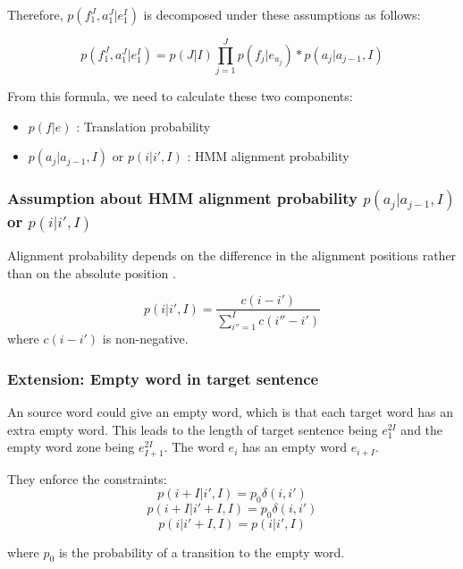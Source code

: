 \documentclass{article}
\begin{document}
Therefore, $p(f_1^J, a_1^J|e_1^I)$ is decomposed under these assumptions as follows:

\begin{equation}
p(f_1^J, a_1^J|e_1^I) = p(J|I) \prod_{j=1}^J p(f_j | e_{a_j}) * p(a_j | a_{j-1}, I)
\label{Och2003SystematicAlignmentModelEquation}
\end{equation}

From this formula, we need to calculate these two components:
\begin{itemize}
\item $ p(f | e) $ : Translation probability
\item $p(a_j | a_{j-1}, I)$ or $p(i | i', I)$ : HMM alignment probability
\end{itemize}

\subsubsection{Assumption about HMM alignment probability $p(a_j | a_{j-1}, I)$ or $p(i | i', I)$}
Alignment probability depends on the difference in the alignment positions rather than on the absolute position \cite{Vogel1996HMM}.

\begin{equation}
p(i | i', I) = \frac{c(i - i')}{\sum_{i''=1}^I c(i'' - i')}
\end{equation}
where $c(i - i')$ is non-negative.

\subsubsection{Extension: Empty word in target sentence}
An source word could give an empty word, which is that each target word has an extra empty word. This leads to the length of target sentence being $e_{1}^{2I}$ and the empty word zone being $e_{I+1}^{2I}$. The word $e_{i}$ has an empty word $e_{i+I}$.

They enforce the constraints:
\begin{equation}
p(i + I | i', I) = p_{0} \delta(i, i')
\end{equation}
\begin{equation}
p(i + I | i' + I, I) = p_{0} \delta(i, i')
\end{equation}
\begin{equation}
p(i | i' + I, I) = p(i | i', I )
\end{equation}

where $p_{0}$ is the probability of a transition to the empty word.
\end{document}
